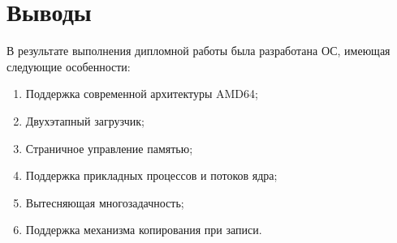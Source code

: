 \documentclass[12pt]{article}
\begin{document}
\section{\textbf{Выводы}}
В результате выполнения дипломной работы была разработана ОС,
имеющая следующие особенности:

\begin{enumerate}
\item Поддержка современной архитектуры AMD64;
\item Двухэтапный загрузчик;
\item Страничное управление памятью;
\item Поддержка прикладных процессов и потоков ядра;
\item Вытесняющая многозадачность;
\item Поддержка механизма копирования при записи.
\end{enumerate}
\end{document}
